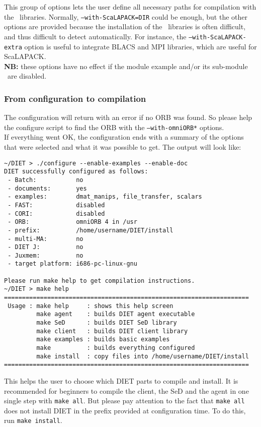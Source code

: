 \noindent This group of options lets the user define all necessary
paths for compilation with the \scalapack\ libraries. Normally,
\texttt{--with-ScaLAPACK=DIR} could be enough, but the other options
are provided because the installation of the \scalapack\ libraries is
often difficult, and thus difficult to detect automatically. For
instance, the \texttt{--with-ScaLAPACK-extra} option is useful to
integrate BLACS and MPI libraries, which are useful for ScaLAPACK.  \\
\textbf{NB:} these options have no effect if the module example and/or
its sub-module \scalapack\ are disabled.

\subsubsection{From configuration to compilation}

The configuration will return with an error if no ORB was found. So
please help the configure script to find the ORB with the
\texttt{--with-omniORB*} options.\\


If everything went OK, the configuration ends with a summary of the
options that were selected and what it was possible to get. The output
will look like: {\footnotesize
\begin{verbatim}
~/DIET > ./configure --enable-examples --enable-doc
DIET successfully configured as follows:
 - Batch:           no
 - documents:       yes
 - examples:        dmat_manips, file_transfer, scalars
 - FAST:            disabled
 - CORI:            disabled
 - ORB:             omniORB 4 in /usr
 - prefix:          /home/username/DIET/install
 - multi-MA:        no
 - DIET J:          no
 - Juxmem:          no
 - target platform: i686-pc-linux-gnu
 
Please run make help to get compilation instructions.
~/DIET > make help
====================================================================
 Usage : make help     : shows this help screen
         make agent    : builds DIET agent executable
         make SeD      : builds DIET SeD library
         make client   : builds DIET client library
         make examples : builds basic examples
         make          : builds everything configured
         make install  : copy files into /home/username/DIET/install
====================================================================
\end{verbatim}
}

This helps the user to choose which DIET parts to compile and
install. It is recommended for beginners to compile the client,
the SeD and the agent in one single step with \texttt{make all}. But
please pay attention to the fact that \texttt{make all} does not
install DIET in the prefix provided at configuration time. To do this,
run \texttt{make install}.

